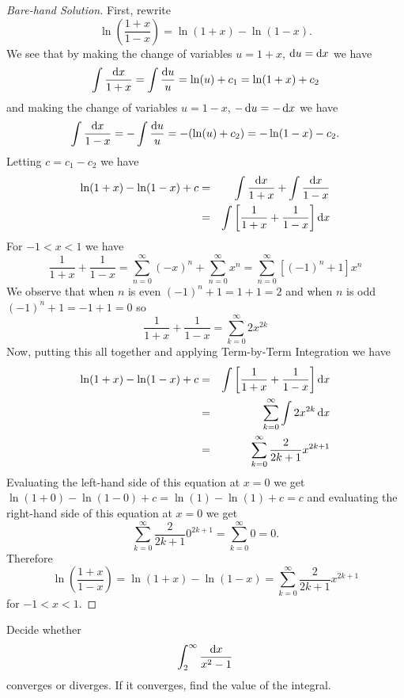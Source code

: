 \documentclass[12pt]{amsart}
\begin{document}
\begin{proof}[Bare-hand Solution]
  First, rewrite
  \[\ln\left(\frac{1+x}{1-x}\right) = \ln(1 + x) - \ln(1 - x).\]
  We see that by making the change of variables \(u = 1 + x\), \(\dif u = \dif x\) we have
  \[\int \frac{\dif x}{1 + x} = \int \frac{\dif u}{u} = \ln(u) + c_1 = \ln(1 + x) + c_2\]
  and making the change of variables \(u = 1-x\), \(-\dif u = -\dif x\) we have
  \[\int \frac{\dif x}{1 - x} = - \int \frac{\dif u}{u} = -(\ln(u) + c_2) = -\ln(1 - x) - c_2.\]
  Letting \(c = c_1 - c_2\) we have
  \begin{eqnarray*}
    \ln(1 + x) - \ln(1 - x) + c 
    &=&\int \frac{\dif x}{1 + x} + \int \frac{\dif x}{1 - x}\\
    &=&\int\left[\frac{1}{1 + x} + \frac{1}{1 - x}\right]\dif x
  \end{eqnarray*}
  For \(-1 < x < 1\) we have
  \[
  \frac{1}{1 + x} + \frac{1}{1 - x} = \sum_{n = 0}^\infty (-x)^n + \sum_{n = 0}^\infty x^n = \sum_{n = 0}^\infty \left[(-1)^n + 1\right]x^n
  \]
  We observe that when \(n\) is even \((-1)^n + 1 = 1 + 1 = 2\) and when \(n\) is odd \((-1)^n + 1 = -1 + 1 = 0\) so
  \[\frac{1}{1 + x} + \frac{1}{1 - x} = \sum_{k = 0}^\infty 2x^{2k}\]
  Now, putting this all together and applying Term-by-Term Integration we have
  \begin{eqnarray*}
    \ln(1 + x) - \ln(1 - x) + c 
    &=&\int\left[\frac{1}{1 + x} + \frac{1}{1 - x}\right]\dif x\\
    &=& \sum_{k=0}^\infty \int 2x^{2k}\dif x\\
    &=& \sum_{k=0}^\infty \frac{2}{2k+1} x^{2k+1}\\
  \end{eqnarray*}
  Evaluating the left-hand side of this equation at \(x = 0\) we get
  \(\ln(1 + 0) - \ln(1 - 0) + c = \ln(1) - \ln(1) + c = c\)
  and evaluating the right-hand side of this equation at \(x = 0\) we get
  \[\sum_{k = 0}^\infty \frac{2}{2k+1} 0^{2k+1} = \sum_{k = 0}^\infty 0 = 0.\]
  Therefore
  \[\ln\left(\frac{1 + x}{1 - x}\right) = \ln(1 + x) - \ln(1 - x) = \sum_{k=0}^\infty \frac{2}{2k+1} x^{2k+1}\]
  for \(-1 < x < 1\).
\end{proof}

\begin{thm}
  Decide whether 
  \[\int_2^\infty \frac{\dif x}{x^2 - 1}\]
  converges or diverges.
  If it converges, find the value of the integral.
\end{thm}
\end{document}
